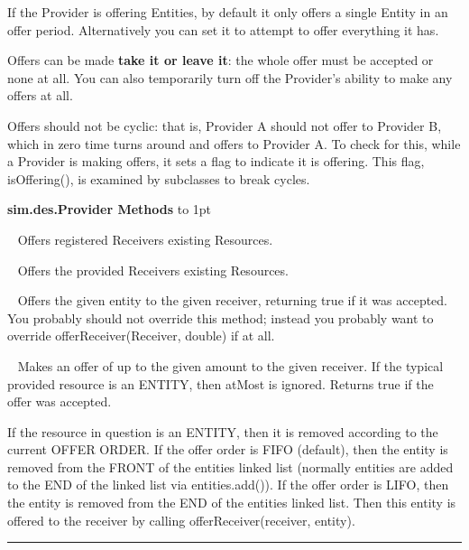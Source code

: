 \documentclass[twoside,10pt]{article}
\newcommand\class[1]{\index{Classes!{#1}}\textsf{#1}}
\newcommand*{\xfill}[1][0pt]{%
	\cleaders
		\hbox to 1pt{\hss
			\raisebox{#1}{\rule{1.2pt}{0.4pt}}%
			\hss}\hfill}
\newenvironment{methods}[1]{
\vspace{1.0em}\noindent\textsf{\textbf{#1 Methods}}\quad \xfill[0.5ex]
\vspace{-0.25em}
\begin{description}
\small}
{\end{description}\hrule\vspace{1.5em}}
\newcommand{\mthd}[1]{\item[{\sf #1}]~\newline}
\begin{document}
If the Provider is offering Entities, by default it only offers a single Entity in an offer period.  Alternatively you can set it to attempt to offer everything it has.

Offers can be made {\bf take it or leave it}: the whole offer must be accepted or none at all.    You can also temporarily turn off the Provider's ability to make any offers at all.

Offers should not be cyclic: that is, Provider A should not offer to Provider B, which in zero time turns around and offers to Provider A.  To check for this, while a Provider is making offers, it sets a flag to indicate it is offering.  This flag, isOffering(), is examined by subclasses to break cycles.

\begin{methods}{\class{sim.des.Provider}}
\mthd{protected boolean offerReceivers()}
Offers registered Receivers existing Resources.
\mthd{protected boolean offerReceivers(ArrayList\(<\)Receiver\(>\) receivers)}
Offers the provided Receivers existing Resources.
\mthd{protected boolean offerReceiver(Receiver receiver, Entity entity)}
        Offers the given entity to the given receiver, returning true if it was
        accepted.  You probably should not override this method; instead you probably
        want to override offerReceiver(Receiver, double) if at all.
\mthd{protected boolean offerReceiver(Receiver receiver, double atMost)}
        Makes an offer of up to the given amount to the given receiver.
        If the typical provided resource is an ENTITY, then atMost is ignored.
        Returns true if the offer was accepted.
        
        If the resource in question is an ENTITY, then it is removed
        according to the current OFFER ORDER.  If the offer order is FIFO
        (default), then the entity is removed from the FRONT of the entities 
        linked list (normally entities are added to the END of the linked list
        via entities.add()).  If the offer order is LIFO, then the entity
        is removed from the END of the entities linked list.  Then this entity
        is offered to the receiver by calling offerReceiver(receiver, entity).
        

\end{methods}
\end{document}
